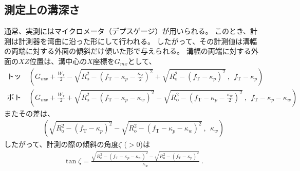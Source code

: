 \subsection{測定上の溝深さ\TBW}
通常、実測にはマイクロメータ（デプスゲージ）が用いられる。
このとき、計測は計測器を湾曲に沿った形にして行われる。
したがって、その計測値は溝幅の両端に対する外面の傾斜だけ傾いた形で与えられる。
溝幅の両端に対する外面の$XZ$位置は、溝中心の$X$座標を$G_{mx}$として、
\begin{align*}
  \text{トップ側：}&~
  \left(
  G_{mx}+\frac{W_x}2
  -\sqrt{R_\mathrm o^2-\left(f_\mathrm T-\kappa_p-\frac{\kappa_w}2\right)^{\!2}}
  +\sqrt{R_\mathrm o^2-\left(f_\mathrm T-\kappa_p\right)^2}~,~~
  f_\mathrm T-\kappa_p
  \right)\\
  \text{ボトム側：}&~
  \left(
  G_{mx}+\frac{W_x}2
  +\sqrt{R_\mathrm o^2-\left(f_\mathrm T-\kappa_p-\kappa_w\right)^2}
  -\sqrt{R_\mathrm o^2-\left(f_\mathrm T-\kappa_p-\frac{\kappa_w}2\right)^{\!2}}~,~~
  f_\mathrm T-\kappa_p-\kappa_w
  \right)
\end{align*}
またその差は、
\begin{align*}
  \left(
  \sqrt{R_\mathrm o^2-\left(f_\mathrm T-\kappa_p\right)^2}
  -\sqrt{R_\mathrm o^2-\left(f_\mathrm T-\kappa_p-\kappa_w\right)^2}~,~~
  \kappa_w
  \right)
\end{align*}
したがって、計測の際の傾斜の角度$\zeta$ ($> 0$)は
\begin{align*}
  \tan\zeta
  = \frac{\sqrt{R_\mathrm o^2-\left(f_\mathrm T-\kappa_p-\kappa_w\right)^2}
          -\sqrt{R_\mathrm o^2-\left(f_\mathrm T-\kappa_p\right)^2}}
         {\kappa_w}\ .
\end{align*}





